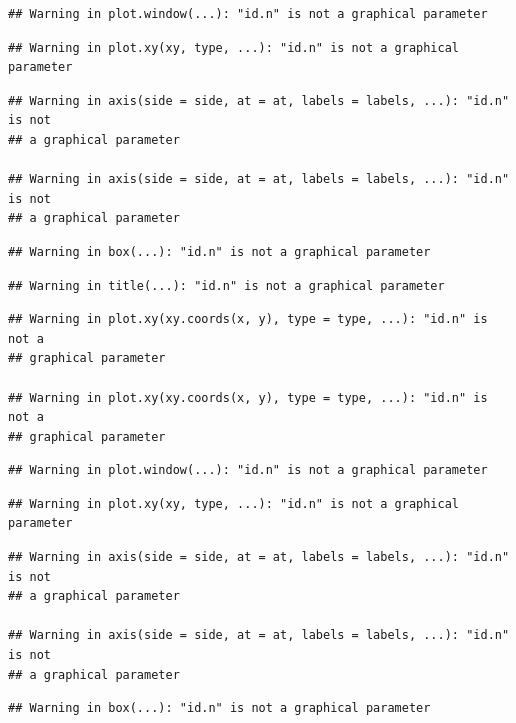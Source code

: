 \documentclass[]{book}
\begin{document}
\begin{verbatim}
## Warning in plot.window(...): "id.n" is not a graphical parameter
\end{verbatim}

\begin{verbatim}
## Warning in plot.xy(xy, type, ...): "id.n" is not a graphical parameter
\end{verbatim}

\begin{verbatim}
## Warning in axis(side = side, at = at, labels = labels, ...): "id.n" is not
## a graphical parameter

## Warning in axis(side = side, at = at, labels = labels, ...): "id.n" is not
## a graphical parameter
\end{verbatim}

\begin{verbatim}
## Warning in box(...): "id.n" is not a graphical parameter
\end{verbatim}

\begin{verbatim}
## Warning in title(...): "id.n" is not a graphical parameter
\end{verbatim}

\begin{verbatim}
## Warning in plot.xy(xy.coords(x, y), type = type, ...): "id.n" is not a
## graphical parameter

## Warning in plot.xy(xy.coords(x, y), type = type, ...): "id.n" is not a
## graphical parameter
\end{verbatim}

\begin{verbatim}
## Warning in plot.window(...): "id.n" is not a graphical parameter
\end{verbatim}

\begin{verbatim}
## Warning in plot.xy(xy, type, ...): "id.n" is not a graphical parameter
\end{verbatim}

\begin{verbatim}
## Warning in axis(side = side, at = at, labels = labels, ...): "id.n" is not
## a graphical parameter

## Warning in axis(side = side, at = at, labels = labels, ...): "id.n" is not
## a graphical parameter
\end{verbatim}

\begin{verbatim}
## Warning in box(...): "id.n" is not a graphical parameter
\end{verbatim}
\end{document}

